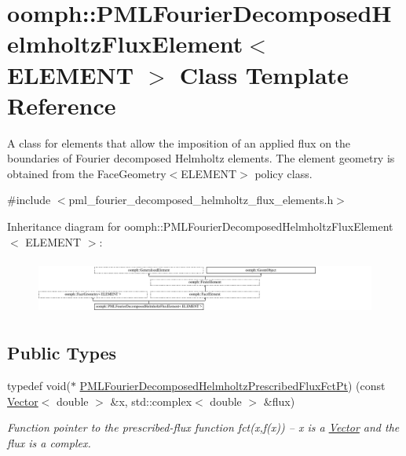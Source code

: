\hypertarget{classoomph_1_1PMLFourierDecomposedHelmholtzFluxElement}{}\section{oomph\+:\+:P\+M\+L\+Fourier\+Decomposed\+Helmholtz\+Flux\+Element$<$ E\+L\+E\+M\+E\+NT $>$ Class Template Reference}
\label{classoomph_1_1PMLFourierDecomposedHelmholtzFluxElement}


A class for elements that allow the imposition of an applied flux on the boundaries of Fourier decomposed Helmholtz elements. The element geometry is obtained from the Face\+Geometry$<$\+E\+L\+E\+M\+E\+N\+T$>$ policy class.  




{\ttfamily \#include $<$pml\+\_\+fourier\+\_\+decomposed\+\_\+helmholtz\+\_\+flux\+\_\+elements.\+h$>$}

Inheritance diagram for oomph\+:\+:P\+M\+L\+Fourier\+Decomposed\+Helmholtz\+Flux\+Element$<$ E\+L\+E\+M\+E\+NT $>$\+:\begin{figure}[H]
\begin{center}
\leavevmode
\includegraphics[height=1.830065cm]{classoomph_1_1PMLFourierDecomposedHelmholtzFluxElement}
\end{center}
\end{figure}
\subsection*{Public Types}
\begin{DoxyCompactItemize}
\item 
typedef void($\ast$ \hyperlink{classoomph_1_1PMLFourierDecomposedHelmholtzFluxElement_a21d234dc11d179dbe417b624c41e764f}{P\+M\+L\+Fourier\+Decomposed\+Helmholtz\+Prescribed\+Flux\+Fct\+Pt}) (const \hyperlink{classoomph_1_1Vector}{Vector}$<$ double $>$ \&x, std\+::complex$<$ double $>$ \&flux)
\begin{DoxyCompactList}\small\item\em Function pointer to the prescribed-\/flux function fct(x,f(x)) -- x is a \hyperlink{classoomph_1_1Vector}{Vector} and the flux is a complex. \end{DoxyCompactList}\end{DoxyCompactItemize}
